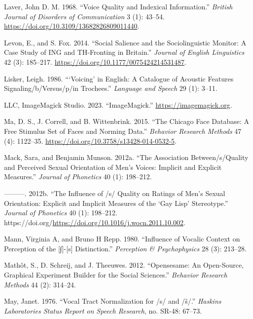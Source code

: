 \documentclass[
  letterpaper,
  DIV=11,
  numbers=noendperiod]{scrartcl}
\newlength{\cslhangindent}
\newenvironment{CSLReferences}[2] %
 {\begin{list}{}{%
  \setlength{\itemindent}{0pt}
  \setlength{\leftmargin}{0pt}
  \setlength{\parsep}{0pt}
  \ifodd #1
   \setlength{\leftmargin}{\cslhangindent}
   \setlength{\itemindent}{-1\cslhangindent}
  \fi
  \setlength{\itemsep}{#2\baselineskip}}}
 {\end{list}}
\begin{document}
\begin{CSLReferences}{1}{0}
Laver, John D. M. 1968. {``Voice Quality and Indexical Information.''}
\emph{British Journal of Disorders of Communication} 3 (1): 43--54.
\url{https://doi.org/10.3109/13682826809011440}.

Levon, E., and S. Fox. 2014. {``Social Salience and the Sociolinguistic
Monitor: {A} Case Study of {ING} and {TH}-Fronting in Britain.''}
\emph{Journal of English Linguistics} 42 (3): 185--217.
\url{https://doi.org/10.1177/0075424214531487}.

Lisker, Leigh. 1986. {``{`Voicing'} in English: A Catalogue of Acoustic
Features Signaling/b/Versus/p/in Trochees.''} \emph{Language and Speech}
29 (1): 3--11.

LLC, ImageMagick Studio. 2023. {``ImageMagick.''}
\url{https://imagemagick.org}.

Ma, D. S., J. Correll, and B. Wittenbrink. 2015. {``The Chicago Face
Database: A Free Stimulus Set of Faces and Norming Data.''}
\emph{Behavior Research Methods} 47 (4): 1122--35.
\url{https://doi.org/10.3758/s13428-014-0532-5}.

Mack, Sara, and Benjamin Munson. 2012a. {``The Association
Between/s/Quality and Perceived Sexual Orientation of Men's Voices:
Implicit and Explicit Measures.''} \emph{Journal of Phonetics} 40 (1):
198--212.

---------. 2012b. {``The Influence of /s/ Quality on Ratings of Men's
Sexual Orientation: Explicit and Implicit Measures of the {`Gay Lisp'}
Stereotype.''} \emph{Journal of Phonetics} 40 (1): 198--212.
https://doi.org/\url{https://doi.org/10.1016/j.wocn.2011.10.002}.

Mann, Virginia A, and Bruno H Repp. 1980. {``Influence of Vocalic
Context on Perception of the {[}∫{]}-{[}s{]} Distinction.''}
\emph{Perception \& Psychophysics} 28 (3): 213--28.

Mathôt, S., D. Schreij, and J. Theeuwes. 2012. {``Opensesame: An
Open-Source, Graphical Experiment Builder for the Social Sciences.''}
\emph{Behavior Research Methods} 44 (2): 314--24.

May, Janet. 1976. {``Vocal Tract Normalization for /s/ and /š/.''}
\emph{Haskins Laboratories Status Report on Speech Research}, no. SR-48:
67--73.


\end{CSLReferences}
\end{document}
